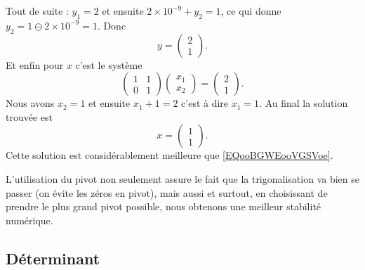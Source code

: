 \begin{example}
    Tout de suite : \( y_1=2\) et ensuite \( 2\times 10^{-9}+y_2=1\), ce qui donne \( y_2=1\ominus 2\times 10^{-9}=1\). Donc
    \begin{equation}
        y=\begin{pmatrix}
            2    \\ 
            1    
        \end{pmatrix}.
    \end{equation}
    Et enfin pour \( x\) c'est le système
    \begin{equation}
        \begin{pmatrix}
            1    &   1    \\ 
            0    &   1    
        \end{pmatrix}\begin{pmatrix}
            x_1    \\ 
            x_2    
        \end{pmatrix}=\begin{pmatrix}
            2    \\ 
            1    
        \end{pmatrix}.
    \end{equation}
    Nous avons \( x_2=1\) et ensuite \( x_1+1=2\) c'est à dire \( x_1=1\). Au final la solution trouvée est
    \begin{equation}
        x=\begin{pmatrix}
            1    \\ 
            1    
        \end{pmatrix}.
    \end{equation}
    Cette solution est considérablement meilleure que \eqref{EQooBGWEooVGSVoe}.
\end{example}

\begin{normaltext}
    L'utilisation du pivot non seulement assure le fait que la trigonalisation va bien se passer (on évite les zéros en pivot), mais aussi et surtout, en choisissant de prendre le plus grand pivot possible, nous obtenons une meilleur stabilité numérique.
\end{normaltext}

\subsection{Déterminant}

